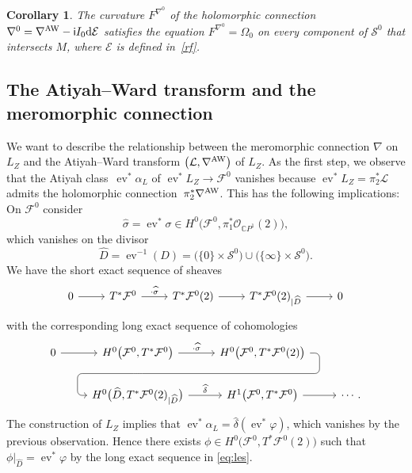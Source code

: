 \documentclass[pdftex]{sigma}
\numberwithin{equation}{section}
\newtheorem{Corollary}[Theorem]{Corollary}
\theoremstyle{definition}
\renewcommand{\i}{\mathsf{i}}
\begin{document}
\begin{Corollary}\label{om0curaw}
The curvature $F^{\nabla^0}$ of the holomorphic connection
$\nabla^0 = \nabla^{\rm AW} -\i I_0{\rm d}\mathcal E$ satisfies the equation
$F^{\nabla^0} = \Omega_0$ on every component of $\mathcal{S}^0$ that intersects $M$, where
$\mathcal E$ is defined in~\eqref{rf}.
\end{Corollary}

\subsection{The Atiyah--Ward transform and the meromorphic connection}

We want to describe the relationship between the meromorphic connection $\nabla$ on $L_Z$ and the
Atiyah--Ward transform $\bigl(\mathcal{L}, \nabla^{\rm AW}\bigr)$ of $L_Z$. As the first step, we observe
that the Atiyah class~$\operatorname{ev}^*\alpha_L$ of $\operatorname{ev}^*L_Z
 \longrightarrow \mathcal F^0$ vanishes because
$\operatorname{ev}^*L_Z = \pi_2^*\mathcal{L}$ admits the holomorphic connection~$\pi_2^*\nabla^{\rm AW}$.
This has the following implications: On $\mathcal F^0$ consider
\[\widehat\sigma
 = \operatorname{ev}^*\sigma \in H^0\bigl({\mathcal F}^0, \pi_1^*{\mathcal O}_{{\mathbb C}P^1}(2)\bigr),\]
which vanishes on the divisor
\[
\widehat{D} = \operatorname{ev}^{-1}(D) = \bigl(\{0\}\times\mathcal S^0\bigr)\cup \bigl(\{\infty\}\times\mathcal S^0\bigr).
\]
We have the short exact sequence of sheaves
\[%
\begin{tikzcd}
0 \ar[r] &T^*\mathcal{F}^0 \ar[r, "\cdot \widehat\sigma"] & T^*\mathcal{F}^0(2) \ar[r] &
T^*\mathcal{F}^0(2)_{|\widehat{D}} \ar[r] & 0
\end{tikzcd}
\]
with the corresponding long exact sequence of cohomologies
\begin{equation}\label{eq:les}
\begin{tikzcd}
0 \ar[r] & H^0\bigl(\mathcal F^0, T^*\mathcal F^0\bigr) \ar[r, "\cdot \widehat\sigma"] \ar[draw=none]{d}[name=X, anchor=center]{} & H^0\bigl(\mathcal F^0,
T^*\mathcal F^0(2)\bigr)
\ar[rounded corners, to path={ -- ([xshift=2ex]\tikztostart.east)
 |- (X.center) \tikztonodes
 -| ([xshift=-2ex]\tikztotarget.west)
 -- (\tikztotarget)}]{dl}[near start]{} \\
 & H^0\bigl(\widehat{D}, T^*\mathcal F^0(2)_{|\widehat{D}}\bigr)
\ar[r, "\widehat{\delta}"] & H^1\bigl(\mathcal F^0, T^*\mathcal F^0\bigr)\ar[r]&\cdots.
\end{tikzcd}
\end{equation}
The construction of $L_Z$ implies that $\operatorname{ev}^*\alpha_L
 = \widehat{\delta}(\operatorname{ev}^*\varphi)$, which vanishes by the previous observation.
Hence there exists $\phi \in H^0\bigl(\mathcal F^0, T^*\mathcal F^0(2)\bigr)$ such that
$\phi|_{\widehat{D}} = \operatorname{ev}^*\varphi$ by the long exact sequence in \eqref{eq:les}.
\end{document}
